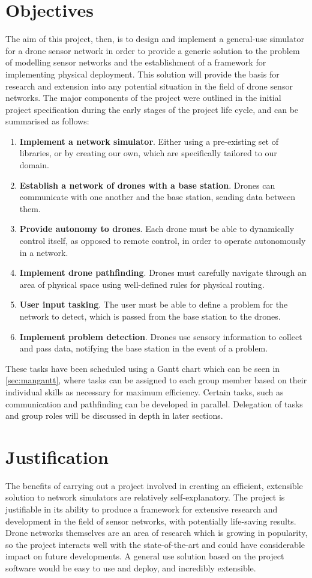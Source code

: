 \section{Objectives}
\label{sec:obj}
The aim of this project, then, is to design and implement a general-use simulator for a drone sensor network in order to provide a generic solution to the problem of modelling sensor networks and the establishment of a framework for implementing physical deployment. This solution will provide the basis for research and extension into any potential situation in the field of drone sensor networks. The major components of the project were outlined in the initial project specification during the early stages of the project life cycle, and can be summarised as follows: 
\begin{enumerate}
  \item \textbf{Implement a network simulator}. Either using a pre-existing set of libraries, or by creating our own, which are specifically tailored to our domain.
  \item \textbf{Establish a network of drones with a base station}. Drones can communicate with one another and the base station, sending data between them.
  \item \textbf{Provide autonomy to drones}. Each drone must be able to dynamically control itself, as opposed to remote control, in order to operate autonomously in a network.
\item \textbf{Implement drone pathfinding}. Drones must carefully navigate through an area of physical space using well-defined rules for physical routing.
\item \textbf{User input tasking}. The user must be able to define a problem for the network to detect, which is passed from the base station to the drones.
\item \textbf{Implement problem detection}. Drones use sensory information to collect and pass data, notifying the base station in the event of a problem.
\end{enumerate}
These tasks have been scheduled using a Gantt chart which can be seen in \ref{sec:mangantt}, where tasks can be assigned to each group member based on their individual skills as necessary for maximum efficiency. Certain tasks, such as communication and pathfinding can be developed in parallel. Delegation of tasks and group roles will be discussed in depth in later sections.

\section{Justification}
The benefits of carrying out a project involved in creating an efficient, extensible solution to network simulators are relatively self-explanatory. The project is justifiable in its ability to produce a framework for extensive research and development in the field of sensor networks, with potentially life-saving results. Drone networks themselves are an area of research which is growing in popularity, so the project interacts well with the state-of-the-art and could have considerable impact on future developments. A general use solution based on the project software would be easy to use and deploy, and incredibly extensible.


